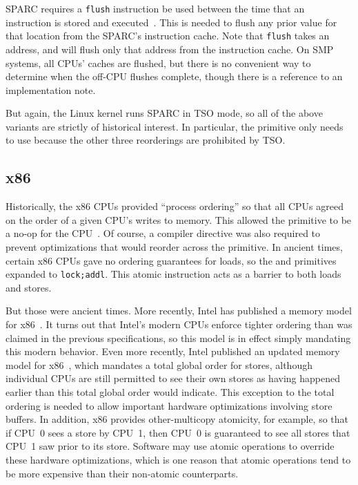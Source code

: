 SPARC requires a {\tt flush} instruction be used between the time that
an instruction is stored and executed~\cite{SPARC94}.
This is needed to flush any prior value for that location from
the SPARC's instruction cache.
Note that {\tt flush} takes an address, and will flush only that address
from the instruction cache.
On SMP systems, all CPUs' caches are flushed, but there is no
convenient way to determine when the off-CPU flushes complete,
though there is a reference to an implementation note.

But again, the Linux kernel runs SPARC in TSO mode, so
all of the above  variants are strictly of historical
interest.
In particular, the  primitive only needs to use 
because the other three reorderings are prohibited by TSO.

\subsection{x86}

Historically, the x86 CPUs provided ``process ordering'' so that all CPUs
agreed on the order of a given CPU's writes to memory.
This allowed the 
primitive to be a no-op for the CPU~\cite{IntelXeonV3-96a}.
Of course, a compiler directive was also required to prevent optimizations
that would reorder across the  primitive.
In ancient times, certain x86 CPUs gave no ordering guarantees for loads, so
the  and  primitives expanded to {\tt lock;addl}.
This atomic instruction acts as a barrier to both loads and stores.

But those were ancient times.
More recently, Intel has published a memory model for
x86~\cite{Intelx86MemoryOrdering2007}.
It turns out that Intel's modern CPUs enforce tighter ordering than
was claimed in the previous specifications, so this model is in effect
simply mandating this modern behavior.
Even more recently, Intel published an updated memory model for
x86~\cite[Section 8.2]{Intel64IA32v3A2011}, which mandates a total global order
for stores, although individual CPUs are still permitted to see their
own stores as having happened earlier than this total global order
would indicate.
This exception to the total ordering is needed to allow important
hardware optimizations involving store buffers.
In addition, x86 provides other-multicopy atomicity, for example,
so that if CPU~0 sees a store by CPU~1, then CPU~0 is guaranteed to see
all stores that CPU~1 saw prior to its store.
Software may use atomic operations to override these hardware optimizations,
which is one reason that atomic operations tend to be more expensive
than their non-atomic counterparts.


